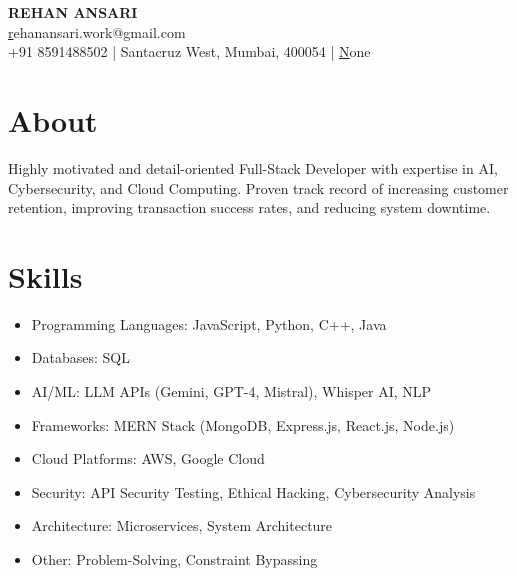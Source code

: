 \documentclass[10pt]{article}
\begin{document}
\begin{center}
    {\Huge \textbf{ REHAN ANSARI }}\\
    \vspace{0.05cm} %
    \href{mailto:rehanansari.work@gmail.com}rehanansari.work@gmail.com \\
    +91 8591488502 | Santacruz West, Mumbai, 400054 | \href{https://None}None
\end{center}

\section*{About}
\vspace{0.05cm}
Highly motivated and detail-oriented Full-Stack Developer with expertise in AI, Cybersecurity, and Cloud Computing. Proven track record of increasing customer retention, improving transaction success rates, and reducing system downtime.


\section*{Skills}
\vspace{0.05cm}
\begin{itemize}[leftmargin=0.5cm, itemsep=2pt] %

  \item Programming Languages: JavaScript, Python, C++, Java

  \item Databases: SQL

  \item AI/ML: LLM APIs (Gemini, GPT-4, Mistral), Whisper AI, NLP

  \item Frameworks: MERN Stack (MongoDB, Express.js, React.js, Node.js)

  \item Cloud Platforms: AWS, Google Cloud

  \item Security: API Security Testing, Ethical Hacking, Cybersecurity Analysis

  \item Architecture: Microservices, System Architecture

  \item Other: Problem-Solving, Constraint Bypassing

\end{itemize}
\end{document}

